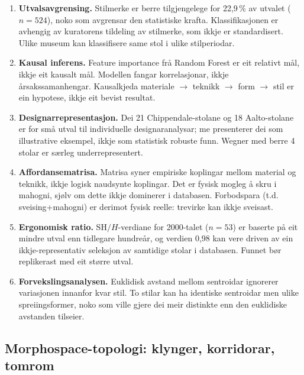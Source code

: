\documentclass[10pt, a4paper, twocolumn]{article}
\begin{document}
\begin{enumerate}
  \item \textbf{Utvalsavgrensing.} Stilmerke er berre tilgjengelege for 22,9\,\% av utvalet ($n = 524$), noko som avgrensar den statistiske krafta. Klassifikasjonen er avhengig av kuratorens tildeling av stilmerke, som ikkje er standardisert. Ulike museum kan klassifisere same stol i ulike stilperiodar.

  \item \textbf{Kausal inferens.} Feature importance frå Random Forest er eit relativt mål, ikkje eit kausalt mål. Modellen fangar korrelasjonar, ikkje årsakssamanhengar. Kausalkjeda materiale $\rightarrow$ teknikk $\rightarrow$ form $\rightarrow$ stil er ein hypotese, ikkje eit bevist resultat.

  \item \textbf{Designarrepresentasjon.} Dei 21 Chippendale-stolane og 18 Aalto-stolane er for små utval til individuelle designaranalysar; me presenterer dei som illustrative eksempel, ikkje som statistisk robuste funn. Wegner med berre 4 stolar er særleg underrepresentert.

  \item \textbf{Affordansematrisa.} Matrisa syner empiriske koplingar mellom material og teknikk, ikkje logisk naudsynte koplingar. Det er fysisk mogleg å skru i mahogni, sjølv om dette ikkje dominerer i databasen. Forbodspara (t.d. sveising+mahogni) er derimot fysisk reelle: trevirke kan ikkje sveisast.

  \item \textbf{Ergonomisk ratio.} $\text{SH}/H$-verdiane for 2000-talet ($n = 53$) er baserte på eit mindre utval enn tidlegare hundreår, og verdien 0,98 kan vere driven av ein ikkje-representativ seleksjon av samtidige stolar i databasen. Funnet bør replikerast med eit større utval.

  \item \textbf{Forvekslingsanalysen.} Euklidisk avstand mellom sentroidar ignorerer variasjonen innanfor kvar stil. To stilar kan ha identiske sentroidar men ulike spreiingsformer, noko som ville gjere dei meir distinkte enn den euklidiske avstanden tilseier.
\end{enumerate}


\subsection{Morphospace-topologi: klynger, korridorar, tomrom}
\end{document}
